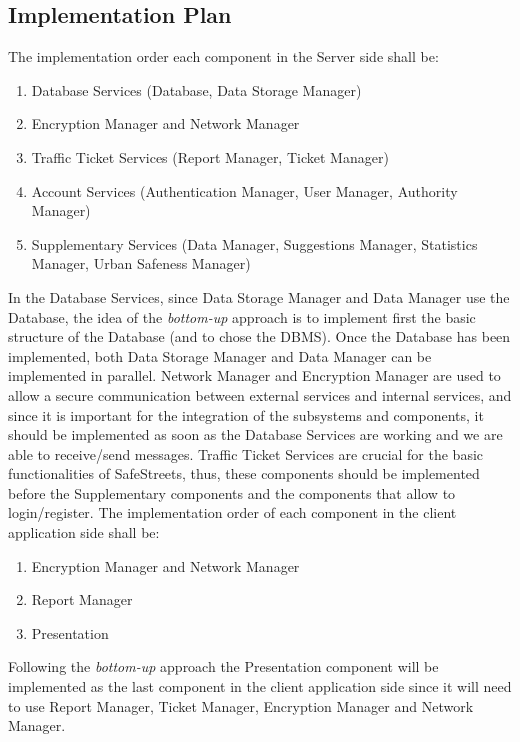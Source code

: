 \subsection{Implementation Plan}
The implementation order each component in the Server side shall be:
\begin{enumerate}
    \item Database Services (Database, Data Storage Manager)
    \item Encryption Manager and Network Manager
    \item Traffic Ticket Services (Report Manager, Ticket Manager)
    \item Account Services (Authentication Manager, User Manager, Authority Manager)
    \item Supplementary Services (Data Manager, Suggestions Manager, Statistics Manager, Urban Safeness Manager)
\end{enumerate}
In the Database Services, since Data Storage Manager and Data Manager use the Database, the idea of the \textit{bottom-up} approach is to implement first the basic structure of the Database (and to chose the DBMS). Once the Database has been implemented, both Data Storage Manager and Data Manager can be implemented in parallel.\newline
Network Manager and Encryption Manager are used to allow a secure communication between external services and internal services, and since it is important for the integration of the subsystems and components, it should be implemented as soon as the Database Services are working and we are able to receive/send messages.\newline
Traffic Ticket Services are crucial for the basic functionalities of SafeStreets, thus, these components should be implemented before the Supplementary components and the components that allow to login/register.\newline
The implementation order of each component in the client application side shall be:
\begin{enumerate}
	\item Encryption Manager and Network Manager
	\item Report Manager
	\item Presentation
\end{enumerate}
Following the \textit{bottom-up} approach the Presentation component will be implemented as the last component in the client application side since it will need to use Report Manager, Ticket Manager, Encryption Manager and Network Manager.
